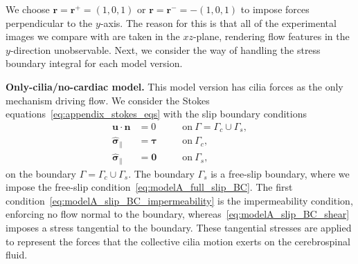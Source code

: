 \documentclass[fleqn]{wlscirep}
\newcommand{\Gs}{\Gamma_{s}}
\newcommand{\Gc}{\Gamma_{c}}
\newcommand{\nn}{\mathbf{n}}
\newcommand{\rr}{\mathbf{r}}
\newcommand{\uu}{\mathbf{u}}
\newcommand{\bsig}{\bm{\sigma}}
\newcommand{\bsigpar}{\hat{\bsig}_{\parallel}}
\newcommand{\btau}{\bm{\tau}}
\begin{document}
We choose $\mathbf{r} = \rr^+ = (1, 0, 1)$ or $\mathbf{r} = \rr^- = -(1, 0, 1)$ to impose forces perpendicular to the $y$-axis.
The reason for this is that all of the experimental images we compare with are taken in the $xz$-plane,
rendering flow features in the $y$-direction unobservable.
Next, we consider the way of handling the stress boundary integral for each model version. 

\textbf{Only-cilia/no-cardiac model.} This model version has cilia forces
as the only mechanism driving flow. We consider the
Stokes equations~\eqref{eq:appendix_stokes_eqs} with the slip boundary conditions
\begin{subequations}
    \begin{alignat}{2}
        \uu\cdot\nn &= 0 \quad &&\mathrm{on} \ \Gamma=\Gc\cup\Gs, \label{eq:modelA_slip_BC_impermeability} \\
        \bsigpar &= \btau \quad &&\mathrm{on} \ \Gc,
        \label{eq:modelA_slip_BC_shear} \\
        \bsigpar &= \mathbf{0} \quad &&\mathrm{on} \ \Gs,\label{eq:modelA_full_slip_BC}
    \end{alignat}\label{eq:modelA_slip_BC}%
\end{subequations}%
on the boundary $\Gamma=\Gamma_c\cup\Gamma_s$. The boundary $\Gamma_s$ is a free-slip boundary, where we impose the free-slip condition~\eqref{eq:modelA_full_slip_BC}. The first condition~\eqref{eq:modelA_slip_BC_impermeability} is the impermeability condition, enforcing no flow normal to the boundary, whereas~\eqref{eq:modelA_slip_BC_shear} imposes a stress tangential to the boundary. These tangential stresses are applied to represent the forces that the collective cilia motion exerts on the cerebrospinal fluid. 
\end{document}
